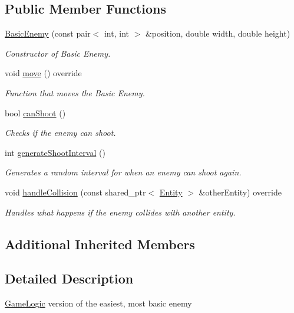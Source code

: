 \subsection*{Public Member Functions}
\begin{DoxyCompactItemize}
\item 
\hyperlink{classGameLogic_1_1BasicEnemy_ac89d53201b55edcce7655e30afd204ed}{Basic\+Enemy} (const pair$<$ int, int $>$ \&position, double width, double height)
\begin{DoxyCompactList}\small\item\em Constructor of Basic Enemy. \end{DoxyCompactList}\item 
void \hyperlink{classGameLogic_1_1BasicEnemy_a8c51b862c94953e5455c04c2227b6d73}{move} () override
\begin{DoxyCompactList}\small\item\em Function that moves the Basic Enemy. \end{DoxyCompactList}\item 
bool \hyperlink{classGameLogic_1_1BasicEnemy_ada4bb368a6af13fbfb1ba83503099f2c}{can\+Shoot} ()
\begin{DoxyCompactList}\small\item\em Checks if the enemy can shoot. \end{DoxyCompactList}\item 
int \hyperlink{classGameLogic_1_1BasicEnemy_adec32036fbf44534988bcbc850a3e3a5}{generate\+Shoot\+Interval} ()
\begin{DoxyCompactList}\small\item\em Generates a random interval for when an enemy can shoot again. \end{DoxyCompactList}\item 
void \hyperlink{classGameLogic_1_1BasicEnemy_a3d01ac4181b0aaa6058d434195e68830}{handle\+Collision} (const shared\+\_\+ptr$<$ \hyperlink{classGameLogic_1_1Entity}{Entity} $>$ \&other\+Entity) override
\begin{DoxyCompactList}\small\item\em Handles what happens if the enemy collides with another entity. \end{DoxyCompactList}\end{DoxyCompactItemize}
\subsection*{Additional Inherited Members}


\subsection{Detailed Description}
\hyperlink{namespaceGameLogic}{Game\+Logic} version of the easiest, most basic enemy 

